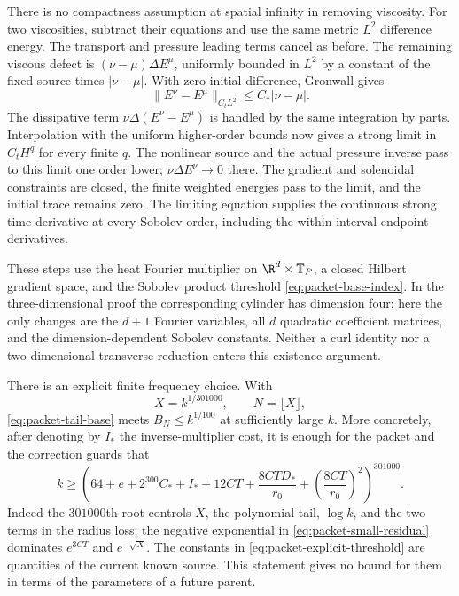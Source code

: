 There is no compactness assumption at spatial infinity in removing
viscosity. For two viscosities, subtract their equations and use the
same metric $L^2$ difference energy. The transport and pressure leading
terms cancel as before. The remaining viscous defect is
$(\nu-\mu)\Delta E^\mu$, uniformly bounded in $L^2$ by a constant
of the fixed source times $|\nu-\mu|$. With zero initial difference,
Gronwall gives
\[
 \|E^\nu-E^\mu\|_{C_tL^2}\le C_*|\nu-\mu|.
\]
The dissipative term $\nu\Delta(E^\nu-E^\mu)$ is handled by the same
integration by parts. Interpolation with the uniform higher-order
bounds now gives a strong limit in $C_tH^q$ for every finite $q$.
The nonlinear source and the actual pressure inverse pass to this limit
one order lower; $\nu\Delta E^\nu\to0$ there. The gradient and
solenoidal constraints are closed, the finite weighted energies pass to
the limit, and the initial trace remains zero. The limiting equation
supplies the continuous strong time derivative at every Sobolev order,
including the within-interval endpoint derivatives.

These steps use the heat Fourier multiplier on
$\R^d\times\mathbb T_P$, a closed Hilbert gradient space, and the
Sobolev product threshold \eqref{eq:packet-base-index}. In the
three-dimensional proof the corresponding cylinder has dimension four;
here the only changes are the $d+1$ Fourier variables, all $d$ quadratic
coefficient matrices, and the dimension-dependent Sobolev constants.
Neither a curl identity nor a two-dimensional transverse reduction
enters this existence argument.

There is an explicit finite frequency choice. With
\[
 X=k^{1/301000},\qquad N=\lfloor X\rfloor,
\]
\eqref{eq:packet-tail-base} meets $B_N\le k^{1/100}$ at sufficiently
large $k$. More concretely, after denoting by $I_*$ the inverse-multiplier
cost, it is enough for the packet and the correction guards that
\begin{equation}\label{eq:packet-explicit-threshold}
 k\ge\left(64+e+2^{300}C_*+I_*+12CT
       +\frac{8CTD_*}{r_0}
       +\left(\frac{8CT}{r_0}\right)^2\right)^{301000}.
\end{equation}
Indeed the $301000$th root controls $X$, the polynomial tail, $\log k$,
and the two terms in the radius loss; the negative exponential in
\eqref{eq:packet-small-residual} dominates $e^{3CT}$ and
$e^{-\sqrt X}$. The constants in \eqref{eq:packet-explicit-threshold}
are quantities of the current known source. This statement gives no
bound for them in terms of the parameters of a future parent.

